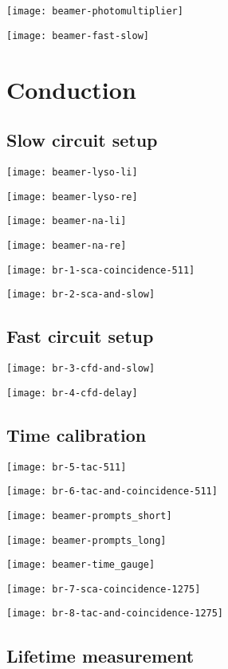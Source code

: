 \documentclass[english, fleqn]{beamer}
\begin{document}
\texttt{[image: beamer-photomultiplier]}

\texttt{[image: beamer-fast-slow]}

\section{Conduction}

\subsection{Slow circuit setup}

\texttt{[image: beamer-lyso-li]}

\texttt{[image: beamer-lyso-re]}

\texttt{[image: beamer-na-li]}

\texttt{[image: beamer-na-re]}

\texttt{[image: br-1-sca-coincidence-511]}

\texttt{[image: br-2-sca-and-slow]}

\subsection{Fast circuit setup}

\texttt{[image: br-3-cfd-and-slow]}

\texttt{[image: br-4-cfd-delay]}

\subsection{Time calibration}

\texttt{[image: br-5-tac-511]}

\texttt{[image: br-6-tac-and-coincidence-511]}

\texttt{[image: beamer-prompts\_short]}

\texttt{[image: beamer-prompts\_long]}

\texttt{[image: beamer-time\_gauge]}

\texttt{[image: br-7-sca-coincidence-1275]}

\texttt{[image: br-8-tac-and-coincidence-1275]}

\subsection{Lifetime measurement}
\end{document}
